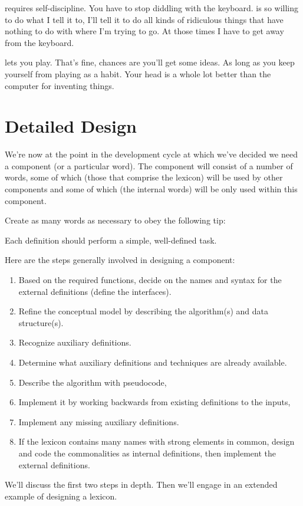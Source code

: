 \begin{interview}
\begin{tfquot}
\Forth{} requires self-discipline. You have to stop diddling with the
keyboard. \Forth{} is so willing to do what I tell it to, I'll tell it to do all
kinds of ridiculous things that have nothing to do with where I'm trying to
go. At those times I have to get away from the keyboard.

\Forth{} lets you play. That's fine, chances are you'll get some ideas. As
long as you keep yourself from playing as a habit. Your head is a whole lot
better than the computer for inventing things.
\end{tfquot}
\end{interview}%

\section{Detailed Design}%

We're now at the point in the development cycle at which we've decided
we need a component (or a particular word). The component will consist
of a number of words, some of which (those that comprise the lexicon) will
be used by other components and some of which (the internal words) will
be only used within this component.

Create as many words as necessary to obey the following tip:

\begin{tip}
Each definition should perform a simple, well-defined task.
\end{tip}%
Here are the steps generally involved in designing a component:
\begin{enumerate}
\item Based on the required functions, decide on the names and syntax for the
   external definitions (define the interfaces).
\item Refine the conceptual model by describing the algorithm(s) and data
   structure(s).
\item Recognize auxiliary definitions.
\item Determine what auxiliary definitions and techniques are already available.
\item Describe the algorithm with pseudocode,
\item Implement it by working backwards from existing definitions to the inputs,
\item Implement any missing auxiliary definitions.
\item If the lexicon contains many names with strong elements in common,
   design and code the commonalities as internal definitions, then implement
   the external definitions.
\end{enumerate}%
We'll discuss the first two steps in depth. Then we'll engage in an
extended example of designing a lexicon.

